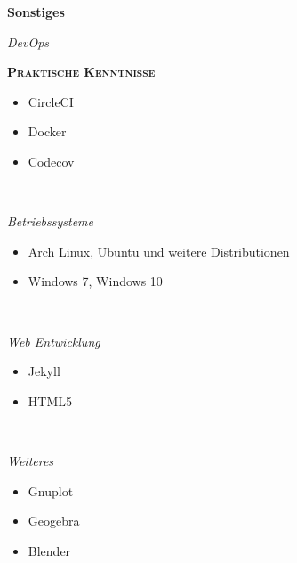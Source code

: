 \documentclass[8pt]{article}
\newcommand{\cvEducationHeading}[2]{%
  {\centering\colorbox{cvBackgroundColor}{\parbox{0.98\linewidth}{\textbf{#1} \hfill \textit{\footnotesize #2}}}} \par
}
\newenvironment{cvEducationItem}[2]{
  \medskip
  \par
  \begin{minipage}[c]{0.15\linewidth}
    \raggedleft
    \footnotesize
    \textit{#1}
  \end{minipage}
  \quad
  \vrule
  \quad
  \begin{minipage}[t]{0.7\linewidth}
    \textsc{\color{cvColor} \textbf{#2}}
    \footnotesize
    \begin{itemize}[itemsep=-1mm, leftmargin=3mm]
}{
    \end{itemize}
  \end{minipage}
  \\[0.5em]
}
\begin{document}
  \newpage
  \cvEducationHeading{Sonstiges}{}
  \begin{multicols}{2}
  \begin{cvEducationItem}{DevOps}{Praktische Kenntnisse}
    \item CircleCI
    \item Docker
    \item Codecov
  \end{cvEducationItem}
  \begin{cvEducationItem}{Betriebssysteme}{}
    \item Arch Linux, Ubuntu und weitere Distributionen
    \item Windows 7, Windows 10
  \end{cvEducationItem}
  \begin{cvEducationItem}{Web Entwicklung}{}
    \item Jekyll
    \item HTML5
  \end{cvEducationItem}
  \begin{cvEducationItem}{Weiteres}{}
    \item Gnuplot
    \item Geogebra
    \item Blender
  \end{cvEducationItem}
  \end{multicols}
\end{document}
